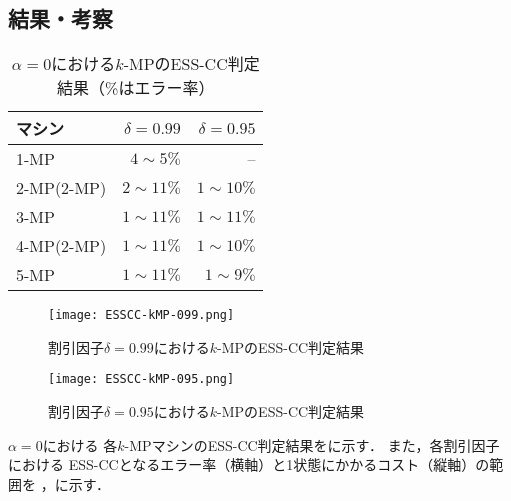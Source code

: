 \documentclass[submit]{ipsj}
\theoremstyle{definition}
\begin{document}
\subsection{結果・考察}

\begin{table}[tb]
  \centering
  \caption{$\alpha = 0$における$k$-MPのESS-CC判定結果（\%はエラー率）}
  \label{tab:ESS-CC-kMP-alpha-0}
  \begin{tabular}{l|rr} \hline\hline
    マシン & $\delta = 0.99$ & $\delta = 0.95$ \\ \hline
    1-MP & $4 \sim 5\%$ & -- \\
    2-MP(2-MP) & $2 \sim 11\%$ & $1 \sim 10\%$ \\
    3-MP & $1 \sim 11\%$ & $1 \sim 11\%$ \\
    4-MP(2-MP) & $1 \sim 11\%$ & $1 \sim 10\%$ \\
    5-MP & $1 \sim 11\%$ & $1 \sim 9\%$ \\ \hline
  \end{tabular}
\end{table}

\begin{figure*}[t]
  \begin{minipage}{0.45\textwidth}
    \centering
    \texttt{[image: ESSCC-kMP-099.png]}
    \caption{割引因子$\delta = 0.99$における$k$-MPのESS-CC判定結果}
    \label{fig:ESS-CC-kMP-099}
  \end{minipage}
  \hfill
  \begin{minipage}{0.45\textwidth}
    \centering
    \texttt{[image: ESSCC-kMP-095.png]}
    \caption{割引因子$\delta = 0.95$における$k$-MPのESS-CC判定結果}
    \label{fig:ESS-CC-kMP-095}
  \end{minipage}
\end{figure*}

$\alpha = 0$における
各$k$-MPマシンのESS-CC判定結果をに示す．
また，各割引因子における
ESS-CCとなるエラー率（横軸）と1状態にかかるコスト（縦軸）の範囲を
，に示す．
\end{document}
